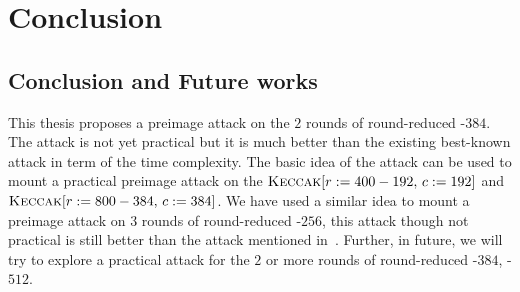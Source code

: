 \chapter{Conclusion}

\section{Conclusion and Future works}
This thesis proposes a preimage attack on the $2$ rounds of round-reduced \KECCAK-$384$. The attack is not yet practical but it is much better than the existing best-known attack in term of the time complexity. The basic idea of the attack can be used to mount a practical preimage attack on the $\mbox{\textsc{Keccak}}[r:=400-192,\, c:=192]$ and $\mbox{\textsc{Keccak}}[r:=800-384,\,c:=384]$. 
We have used a similar idea to mount a preimage attack on $3$ rounds of round-reduced \KECCAK-$256$, this attack though not practical is still better than the attack mentioned in~\cite{guo2016linear}.
Further, in future, we will try to explore a practical attack for the $2$ or more rounds of round-reduced \KECCAK-$384$, \KECCAK-$512$.

